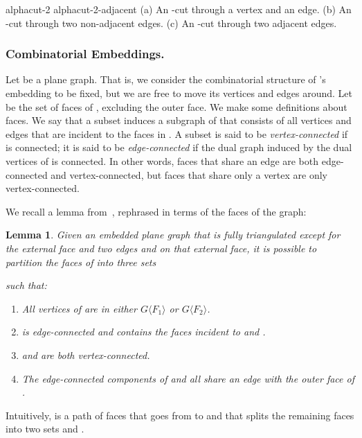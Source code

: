 \documentclass[11pt]{article}
\newcommand {\fsg} [1] {\ensuremath {G \langle #1 \rangle}}
\newtheorem {lemma} {Lemma}
\renewcommand{\subsection}[1]{\subsubsection{#1.}}
\begin{document}
     {alphacut-2} {alphacut-2-adjacent}
    {(a) An -cut through a vertex and an edge. (b) An -cut through two non-adjacent
    edges. (c) An -cut through two adjacent edges.}

  \subsection {Combinatorial Embeddings}

    Let  be a plane graph.
    That is, we consider the combinatorial structure of 's
    embedding to be fixed,
    but we are free to move its vertices and edges around.
    Let  be the set of faces of , excluding the outer face.
We make some definitions about faces.
    We say that a subset  induces a subgraph  of 
    that consists of all vertices and edges that are incident to the faces
    in .
    A subset  is said to be \emph {vertex-connected} if 
    is connected; it is said to be \emph {edge-connected} if the dual graph
    induced by the dual vertices of  is connected. In other words, faces
    that share an edge are both edge-connected and vertex-connected, but faces
    that share only a vertex are only vertex-connected.



    We recall a lemma from~\cite{duncan},
    rephrased in terms of the faces of the
    graph:

    \begin{lemma}
    \label{lem:river}
      Given an embedded plane graph  that is fully triangulated except for the
      external face and two edges  and  on that external face,
      it is possible to partition the faces of  into three sets
      
      such that:
      \begin{enumerate}
        \item All vertices of  are in either \fsg {F_1} or \fsg {F_2}.
        \item  is edge-connected and contains the faces incident to 
          and .
        \item  and  are both vertex-connected.
        \item The edge-connected components of  and  all share an edge
          with the outer face of .
      \end{enumerate}
    \end{lemma}


    Intuitively,  is a path of faces that goes from  to  and that
    splits the remaining faces into two sets  and .
\end{document}
